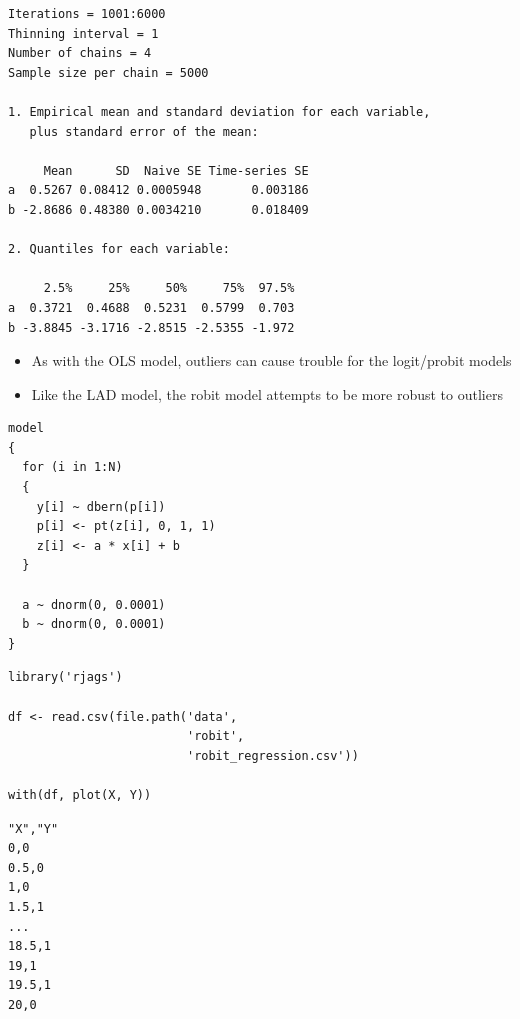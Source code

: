 \documentclass{beamer}
\begin{document}
\begin{frame}[fragile]
  \begin{verbatim}
Iterations = 1001:6000
Thinning interval = 1 
Number of chains = 4 
Sample size per chain = 5000 

1. Empirical mean and standard deviation for each variable,
   plus standard error of the mean:

     Mean      SD  Naive SE Time-series SE
a  0.5267 0.08412 0.0005948       0.003186
b -2.8686 0.48380 0.0034210       0.018409

2. Quantiles for each variable:

     2.5%     25%     50%     75%  97.5%
a  0.3721  0.4688  0.5231  0.5799  0.703
b -3.8845 -3.1716 -2.8515 -2.5355 -1.972
  \end{verbatim}
\end{frame}

\begin{frame}
  \begin{itemize}
    \item{As with the OLS model, outliers can cause trouble for the logit/probit models}
    \item{Like the LAD model, the robit model attempts to be more robust to outliers}
  \end{itemize}
\end{frame}

\begin{frame}[fragile]
  \begin{verbatim}
model
{
  for (i in 1:N)
  {
    y[i] ~ dbern(p[i])
    p[i] <- pt(z[i], 0, 1, 1)
    z[i] <- a * x[i] + b
  }
  
  a ~ dnorm(0, 0.0001)
  b ~ dnorm(0, 0.0001)
}
  \end{verbatim}
\end{frame}

\begin{frame}[fragile]
  \begin{verbatim}
library('rjags')

df <- read.csv(file.path('data',
                         'robit',
                         'robit_regression.csv'))

with(df, plot(X, Y))
  \end{verbatim}
\end{frame}

\begin{frame}[fragile]
  \begin{verbatim}
"X","Y"
0,0
0.5,0
1,0
1.5,1
...
18.5,1
19,1
19.5,1
20,0
  \end{verbatim}
\end{frame}
\end{document}
